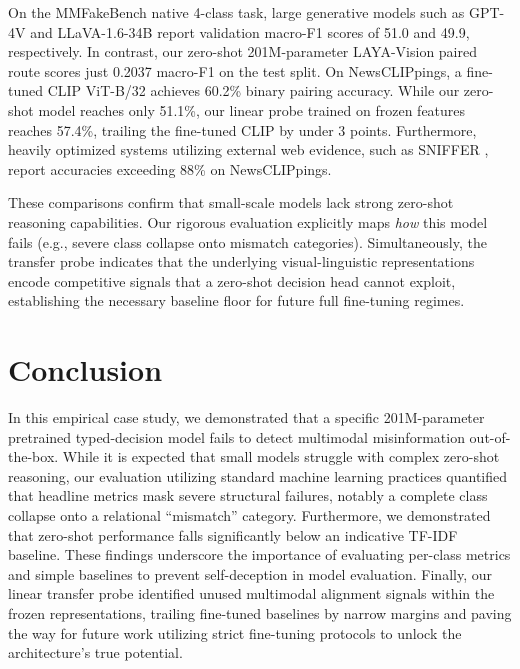 \documentclass{article} %
\begin{document}
On the MMFakeBench native 4-class task, large generative models such as GPT-4V and LLaVA-1.6-34B report validation macro-F1 scores of 51.0 and 49.9, respectively. In contrast, our zero-shot 201M-parameter LAYA-Vision paired route scores just 0.2037 macro-F1 on the test split. On NewsCLIPpings, a fine-tuned CLIP ViT-B/32 achieves 60.2\% binary pairing accuracy. While our zero-shot model reaches only 51.1\%, our linear probe trained on frozen features reaches 57.4\%, trailing the fine-tuned CLIP by under 3 points. Furthermore, heavily optimized systems utilizing external web evidence, such as SNIFFER \citep{Qi2024SnifferMultimodal}, report accuracies exceeding 88\% on NewsCLIPpings. 

These comparisons confirm that small-scale models lack strong zero-shot reasoning capabilities. Our rigorous evaluation explicitly maps \textit{how} this model fails (e.g., severe class collapse onto mismatch categories). Simultaneously, the transfer probe indicates that the underlying visual-linguistic representations encode competitive signals that a zero-shot decision head cannot exploit, establishing the necessary baseline floor for future full fine-tuning regimes.

\section{Conclusion}
\label{sec:conclusion}
In this empirical case study, we demonstrated that a specific 201M-parameter pretrained typed-decision model fails to detect multimodal misinformation out-of-the-box. While it is expected that small models struggle with complex zero-shot reasoning, our evaluation utilizing standard machine learning practices quantified that headline metrics mask severe structural failures, notably a complete class collapse onto a relational ``mismatch'' category. Furthermore, we demonstrated that zero-shot performance falls significantly below an indicative TF-IDF baseline. These findings underscore the importance of evaluating per-class metrics and simple baselines to prevent self-deception in model evaluation. Finally, our linear transfer probe identified unused multimodal alignment signals within the frozen representations, trailing fine-tuned baselines by narrow margins and paving the way for future work utilizing strict fine-tuning protocols to unlock the architecture's true potential.




\end{document}
